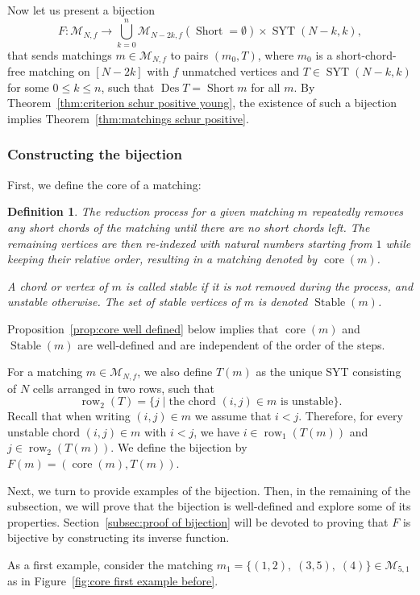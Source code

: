 \documentclass[11pt]{article}
\newtheorem{definition}[theo]{Definition}
\theoremstyle{definition}
\numberwithin{equation}{section}
\newcommand{\Des}{\operatorname{Des}}
\newcommand{\Syt}{\operatorname{SYT}}
\newcommand{\Short}{\operatorname{Short}}
\newcommand{\Stable}{\operatorname{Stable}}
\newcommand{\core}{\operatorname{core}}
\newcommand{\row}{\operatorname{row}}
\newcommand{\M}{\mathcal{M}}
\begin{document}
Now let us present a bijection
\[
    F:\M_{N,f} \to \bigcup_{k=0}^n \M_{N-2k,f}(\Short = \emptyset) \times \Syt(N-k,k),
\]
that sends matchings $m \in \M_{N,f}$ to pairs $(m_0,T)$, where $m_0$ is a short-chord-free matching on $[N-2k]$ with $f$ unmatched vertices and $T\in \Syt(N-k,k)$ for some $0\le k \le n$, such that
$\Des T = \Short m$ for all $m$. By Theorem~\ref{thm:criterion schur positive young}, the existence of such a bijection implies Theorem~\ref{thm:matchings schur positive}.

\subsubsection{Constructing the bijection}
\label{subsec:constructing the bijection}
First, we define the core of a matching:
\begin{definition}
\label{def:core of matching}
    The reduction process for a given matching $m$ repeatedly removes any short chords of the matching until there are no short chords left. The remaining vertices are then re-indexed with natural numbers starting from $1$ while keeping their relative order, resulting in a matching denoted by $\core(m)$.
    
    A chord or vertex of $m$ is called \emph{stable} if it is not removed during the process, and unstable otherwise.
    The set of stable vertices of $m$ is denoted $\Stable(m)$.
\end{definition}

Proposition~\ref{prop:core well defined} below implies that $\core(m)$ and $\Stable(m)$ are well-defined and are independent of the order of the steps.

For a matching $m \in \M_{N,f}$, we also define $T(m)$ as the unique SYT consisting of $N$ cells arranged in two rows, such that
\[
    \row_2(T) = \{j \mid \text{the chord } (i,j) \in m \text{ is unstable}\}.
\]
Recall that when writing $(i,j) \in m$ we assume that $i<j$. Therefore, for every unstable chord $(i,j)\in m$ with $i<j$, we have $i \in \row_1(T(m))$ and $j \in \row_2(T(m))$. We define the bijection by $F(m) = (\core(m),T(m))$.

Next, we turn to provide examples of the bijection. Then, in the remaining of the subsection, we will prove that the bijection is well-defined and explore some of its properties. Section~\ref{subsec:proof of bijection} will be devoted to proving that $F$ is bijective by constructing its inverse function.

As a first example, consider the matching $m_1 = \{(1,2),\; (3,5),\; (4)\} \in \M_{5,1}$ as in Figure~\ref{fig:core first example before}.
\end{document}
